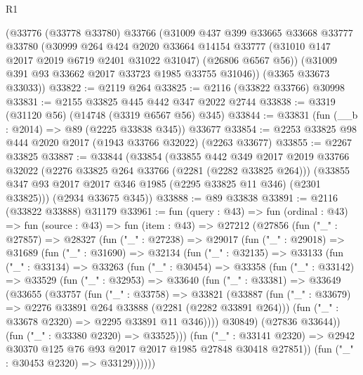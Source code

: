 \begin{lexlean}{R1}
\begin{coremodule}
    (@33776
      (@33778 @33780)
      @33766
      (@31009
        @437
        @399
        @33665
        @33668
        @33777
        @33780
        (@30999
          @264
          @424
          @2020
          @33664
          @14154
          @33777
          (@31010 @147 @2017 @2019 @6719 @2401 @31022 @31047)
          (@26806 @6567 @56))
        (@31009 @391 @93 @33662 @2017 @33723 @1985 @33755 @31046))
      (@3365 @33673 @33033))
@33822 := @2119 @264
@33825 := @2116 (@33822 @33766) @30998
@33831 := @2155 @33825 @445 @442 @347 @2022 @2744
@33838 := @3319 (@31120 @56) (@14748 (@3319 @6567 @56) @345)
@33844 := @33831 (fun (__b : @2014) => @89 (@2225 @33838 @345)) @33677
@33854 := @2253 @33825 @98 @444 @2020 @2017 (@1943 @33766 @32022) (@2263 @33677)
@33855 := @2267 @33825
@33887 := @33844
    (@33854
      (@33855
        @442
        @349
        @2017
        @2019
        @33766
        @32022
        (@2276 @33825 @264 @33766 (@2281 (@2282 @33825 @264)))
        (@33855 @347 @93 @2017 @2017 @346 @1985 (@2295 @33825 @11 @346) (@2301 @33825)))
      (@2934 @33675 @345))
@33888 := @89 @33838
@33891 := @2116 (@33822 @33888) @31179
@33961 := fun (query : @43) =>
  fun (ordinal : @43) =>
  fun (source : @43) =>
  fun (item : @43) =>
  @27212
    (@27856
      (fun ("_" : @27857) =>
      @28327
        (fun ("_" : @27238) =>
        @29017
          (fun ("_" : @29018) =>
          @31689
            (fun ("_" : @31690) =>
            @32134
              (fun ("_" : @32135) =>
              @33133
                (fun ("_" : @33134) =>
                @33263
                  (fun ("_" : @30454) =>
                  @33358
                    (fun ("_" : @33142) =>
                    @33529
                      (fun ("_" : @32953) =>
                      @33640
                        (fun ("_" : @33381) =>
                        @33649
                          (@33655
                            (@33757
                              (fun ("_" : @33758) =>
                              @33821
                                (@33887
                                  (fun ("_" : @33679) =>
                                  @2276 @33891 @264 @33888 (@2281 (@2282 @33891 @264)))
                                  (fun ("_" : @33678 @2320) => @2295 @33891 @11 @346))))
                            @30849)
                          (@27836 @33644))
                        (fun ("_" : @33380 @2320) => @33525)))
                    (fun ("_" : @33141 @2320) =>
                    @2942 @30370 @125 @76 @93 @2017 @2017 @1985 @27848 @30418 @27851))
                  (fun ("_" : @30453 @2320) => @33129))))))

\end{coremodule}
\end{lexlean}
